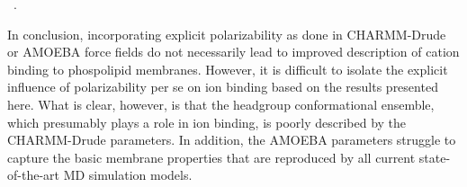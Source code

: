 \documentclass[journal=jacsat,manuscript=article,layout=singlecolumn]{achemso}
\begin{document}
 ~.




In conclusion, incorporating explicit polarizability as done in CHARMM-Drude or AMOEBA force fields do not necessarily lead to improved description of cation binding to phospolipid membranes. However, it is difficult to isolate the explicit influence of polarizability per se on ion binding based on the results presented here. What is clear, however, is that the headgroup conformational ensemble, which presumably plays a role in ion binding, is poorly described by the CHARMM-Drude parameters. In addition, the AMOEBA parameters struggle to capture the basic membrane properties that are reproduced by all current state-of-the-art MD simulation models.
\end{document}
